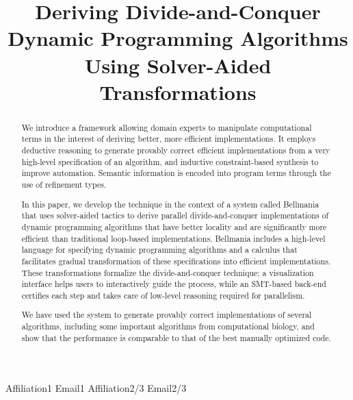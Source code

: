 \documentclass[10pt,numbers]{sigplanconf}
\begin{document}




\title{Deriving Divide-and-Conquer Dynamic Programming Algorithms Using 
  Solver-Aided Transformations}

           {Affiliation1}
           {Email1}
           {Affiliation2/3}
           {Email2/3}

\maketitle

\begin{abstract}
We introduce a framework allowing domain experts
to manipulate computational terms
in the interest of deriving better, more efficient implementations.
It employs deductive reasoning to generate provably correct efficient implementations from a very high-level specification of an algorithm,
and inductive constraint-based synthesis to improve automation.
Semantic information is encoded into program terms through the use of refinement types.

In this paper, we develop the technique in the context of a system called Bellmania that uses solver-aided tactics to derive parallel divide-and-conquer implementations of dynamic programming algorithms that have better locality and are significantly more efficient than traditional loop-based implementations. Bellmania includes a high-level language for specifying dynamic programming algorithms and a calculus that facilitates gradual transformation of these specifications into efficient implementations.
These transformations formalize the divide-and-conquer technique; a visualization interface helps users to interactively guide the process,
while an SMT-based back-end certifies each step
and takes care of low-level reasoning required for parallelism.

We have used the system to generate provably correct implementations of several algorithms, including some important algorithms from computational biology, and show that the performance is comparable to that of the best manually optimized code.
\end{abstract}
\end{document}
